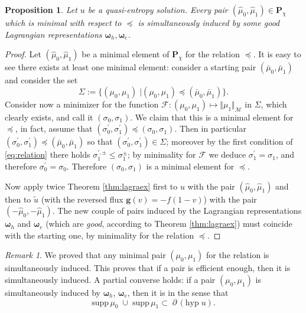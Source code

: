 \documentclass[11pt, twoside, reqno]{amsart}
\newtheorem{prop}[thm]{Proposition}
\theoremstyle{definition}
\theoremstyle{remark}
\newtheorem{remark}[thm]{Remark}
\numberwithin{equation}{section}
\newcommand{\mc}[1]{\mathcal{#1}}
\newcommand{\mr}[1]{\mathrm{#1}}
\newcommand{\bs}[1]{\boldsymbol{#1}}
\newcommand{\msc}[1]{\mathscr{#1}}
\newcommand{\wt}[1]{\widetilde{#1}}
\begin{document}
\begin{prop}\label{prop:goodpairs}
    Let $u$ be a quasi-entropy solution. Every pair $(\widehat \mu_0, \widehat \mu_1) \in \mathbf P_\chi$  which is minimal with respect to $\preceq$ is simultaneously induced by some good Lagrangian representations $\bs \omega_h, \bs \omega_e$.
\end{prop}
\begin{proof}

Let $(\widehat \mu_0, \widehat \mu_1)$ be a minimal element  of $\mathbf P_{\chi}$ for the relation $\preceq$. It is easy to see there exists at least one minimal element: consider a starting pair $(\bar \mu_0, \bar \mu_1)$ and consider the set 
$$
\Sigma := \{(\mu_0, \mu_1) \; | (\mu_0, \mu_1) \preceq (\bar \mu_0, \bar \mu_1)\}.
$$
Consider now a minimizer for the function $\mc F: (\mu_0,  \mu_1) \mapsto\Vert \mu_1\Vert_{\msc M}$ in $\Sigma$, which clearly exists, and call it $(\sigma_0, \sigma_1)$. We claim that this is a minimal element for $\preceq$, in fact, assume that $(\sigma^\prime_0, \sigma_1^\prime) \preceq (\sigma_0, \sigma_1)$. Then in particular $(\sigma^\prime_0, \sigma_1^\prime)  \preceq (\bar \mu_0, \bar \mu_1) $ so that $(\sigma^\prime_0, \sigma_1^\prime)   \in \Sigma$; moreover by the first condition of \eqref{eq:relation} there  holds $\sigma_1^{\prime,\pm} \leq \sigma_1^{\pm}$; by minimality for $\mc F$ we deduce $\sigma_1^\prime = \sigma_1$, and therefore $\sigma_0^\prime = \sigma_0$. Therefore $(\sigma_0, \sigma_1)$ is a minimal element for $\preceq$.



Now apply twice Theorem \ref{thm:lagraex} first to $u$ with the pair $(\widehat \mu_0, \widehat \mu_1)$ and then to $\wt u$ (with the reversed flux $\bs g(v) = -f(1-v)$) with the pair $(-\widehat \mu_0, -\widehat \mu_1)$. The new couple of pairs induced by the Lagrangian representations $\bs \omega_h$ and $\bs \omega_e$ (which are \emph{good}, according to Theorem \ref{thm:lagraex}) must coincide with the starting one, by minimality for the relation $\preceq$.
\end{proof}


\begin{remark}
We proved that any minimal pair $(\mu_0, \mu_1)$ for the relation \say {$\preceq$} is simultaneously induced. This proves that if a pair is efficient enough, then it is simultaneously induced. A partial converse holds: if a pair $(\mu_0, \mu_1)$ is simultaneously induced by $\bs \omega_h$, $\bs \omega_e$, then it is  in the sense that 
$$
\mr{supp}\, \mu_0\;  \cup \; \mr{supp}\, \mu_1  \subset \; \partial\, (\mr{hyp}\; u).
$$
\end{remark}
\end{document}
